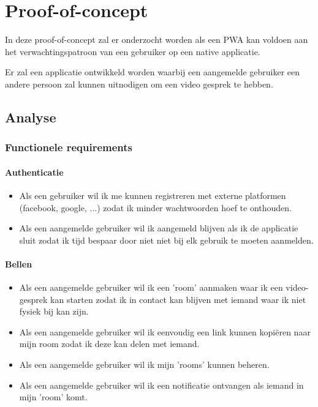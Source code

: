 \chapter{Proof-of-concept}
\label{ch:Proof-of-concept}

In deze proof-of-concept zal er onderzocht worden als een PWA kan voldoen aan het verwachtingspatroon van een gebruiker op een native applicatie.

Er zal een applicatie ontwikkeld worden waarbij een aangemelde gebruiker een  andere persoon zal kunnen uitnodigen om een video gesprek te hebben. 

 \section{Analyse}
	 \subsection{Functionele requirements}
	 	\subsubsection{Authenticatie}
		 	\begin{itemize}
			 	\item Als een gebruiker wil ik me kunnen registreren met externe platformen (facebook, google, ...) zodat ik minder wachtwoorden hoef te onthouden.
			 	\item Als een aangemelde gebruiker wil ik aangemeld blijven als ik de applicatie sluit zodat ik tijd bespaar door niet niet bij elk gebruik te moeten aanmelden.
		 	\end{itemize}
		 	
		 \subsubsection{Bellen}
			  \begin{itemize}
			   	\item Als een aangemelde gebruiker wil ik een 'room' aanmaken waar ik een video-gesprek kan starten zodat ik in contact kan blijven met iemand waar ik niet fysiek bij kan zijn.
			   	\item Als een aangemelde gebruiker wil ik eenvoudig een link kunnen kopiëren naar mijn room zodat ik deze kan delen met iemand.
			   	\item Als een aangemelde gebruiker wil ik mijn 'rooms' kunnen beheren.
			   	\item Als een aangemelde gebruiker wil ik een notificatie ontvangen als iemand in mijn 'room' komt.
			  \end{itemize}
	 	

